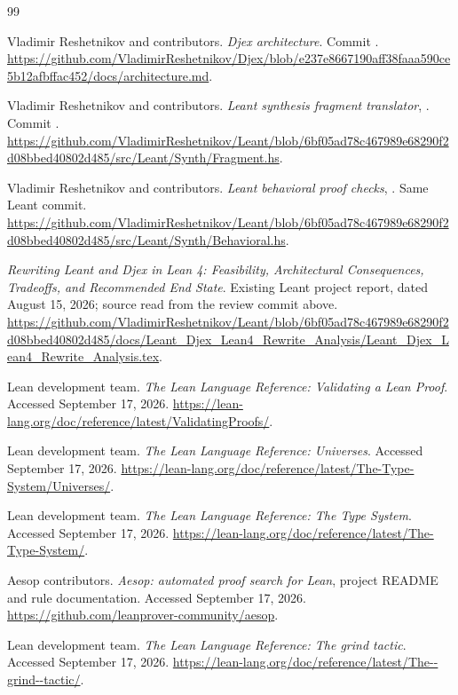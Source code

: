 \clearpage
\begin{thebibliography}{99}
\raggedright
{}
 Vladimir Reshetnikov and contributors.
\emph{Djex architecture}. Commit .
\url{https://github.com/VladimirReshetnikov/Djex/blob/e237e8667190aff38faaa590ce5b12afbffac452/docs/architecture.md}.

 Vladimir Reshetnikov and contributors.
\emph{Leant synthesis fragment translator}, .
Commit .
\url{https://github.com/VladimirReshetnikov/Leant/blob/6bf05ad78c467989e68290f2d08bbed40802d485/src/Leant/Synth/Fragment.hs}.

 Vladimir Reshetnikov and contributors.
\emph{Leant behavioral proof checks}, .
Same Leant commit.
\url{https://github.com/VladimirReshetnikov/Leant/blob/6bf05ad78c467989e68290f2d08bbed40802d485/src/Leant/Synth/Behavioral.hs}.

 \emph{Rewriting Leant and Djex in Lean 4: Feasibility, Architectural Consequences, Tradeoffs, and Recommended End State}.
Existing Leant project report, dated August 15, 2026; source read from the review commit above.
\url{https://github.com/VladimirReshetnikov/Leant/blob/6bf05ad78c467989e68290f2d08bbed40802d485/docs/Leant_Djex_Lean4_Rewrite_Analysis/Leant_Djex_Lean4_Rewrite_Analysis.tex}.

 Lean development team.
\emph{The Lean Language Reference: Validating a Lean Proof}.
Accessed September 17, 2026.
\url{https://lean-lang.org/doc/reference/latest/ValidatingProofs/}.

 Lean development team.
\emph{The Lean Language Reference: Universes}.
Accessed September 17, 2026.
\url{https://lean-lang.org/doc/reference/latest/The-Type-System/Universes/}.

 Lean development team.
\emph{The Lean Language Reference: The Type System}.
Accessed September 17, 2026.
\url{https://lean-lang.org/doc/reference/latest/The-Type-System/}.

 Aesop contributors.
\emph{Aesop: automated proof search for Lean}, project README and rule documentation.
Accessed September 17, 2026.
\url{https://github.com/leanprover-community/aesop}.

 Lean development team.
\emph{The Lean Language Reference: The grind tactic}.
Accessed September 17, 2026.
\url{https://lean-lang.org/doc/reference/latest/The--grind--tactic/}.


\end{thebibliography}
